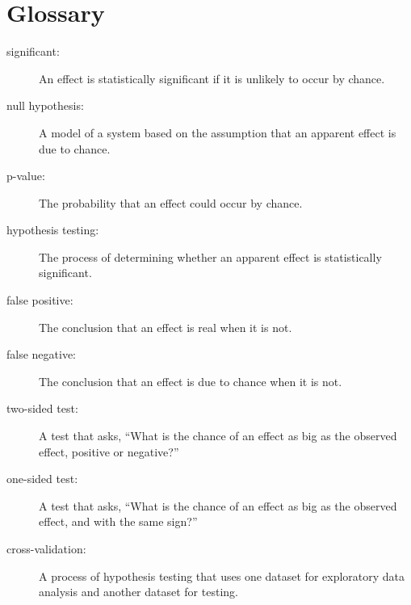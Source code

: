\documentclass[12pt]{book}
\begin{document}











\section{Glossary}

\begin{description}

\item[significant:] An effect is statistically significant if it is unlikely
to occur by chance.

\item[null hypothesis:] A model of a system based on the assumption that
an apparent effect is due to chance.

\item[p-value:] The probability that an effect could occur by chance.

\item[hypothesis testing:] The process of determining whether an apparent
effect is statistically significant.

\item[false positive:] The conclusion that an effect is real when it is not.

\item[false negative:] The conclusion that an effect is due to chance when it
is not.

\item[two-sided test:] A test that asks, ``What is the chance of an effect
as big as the observed effect, positive or negative?''

\item[one-sided test:] A test that asks, ``What is the chance of an effect
as big as the observed effect, and with the same sign?''

\item[cross-validation:] A process of hypothesis testing that uses one
dataset for exploratory data analysis and another dataset for testing.


\end{description}
\end{document}
